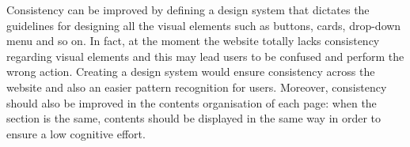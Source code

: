 Consistency can be improved by defining a design system that dictates the guidelines for designing all the visual elements such as buttons, cards, drop-down menu and so on. In fact, at the moment the website totally lacks consistency regarding visual elements and this may lead users to be confused and perform the wrong action. Creating a design system would ensure consistency across the website and also an easier pattern recognition for users. Moreover, consistency should also be improved in the contents organisation of each page: when the section is the same, contents should be displayed in the same way in order to ensure a low cognitive effort.




